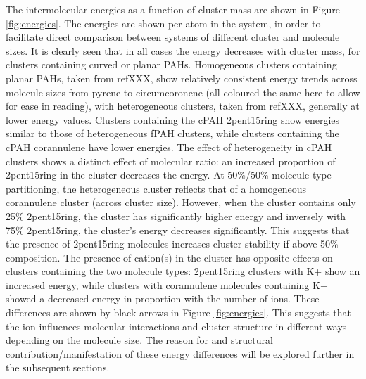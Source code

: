 The intermolecular energies as a function of cluster mass are shown in Figure \ref{fig:energies}.  The energies are shown per atom in the system, in order to facilitate direct comparison between systems of different cluster and molecule sizes.
It is clearly seen that in all cases the energy decreases with cluster mass, for clusters containing curved or planar PAHs.  Homogeneous clusters containing planar PAHs, taken from refXXX, show relatively consistent energy trends across molecule sizes from pyrene to circumcoronene (all coloured the same here to allow for ease in reading), with heterogeneous clusters, taken from refXXX, generally at lower energy values.  Clusters containing the cPAH 2pent15ring show energies similar to those of heterogeneous fPAH clusters, while clusters containing the cPAH corannulene have lower energies.
The effect of heterogeneity in cPAH clusters shows a distinct effect of molecular ratio: an increased proportion of 2pent15ring in the cluster decreases the energy. At 50\%/50\% molecule type partitioning, the heterogeneous cluster reflects that of a homogeneous corannulene cluster (across cluster size). However, when the cluster contains only 25\% 2pent15ring, the cluster has significantly higher energy and inversely with 75\% 2pent15ring, the cluster's energy decreases significantly.  This suggests that the presence of 2pent15ring molecules increases cluster stability if above 50\% composition.
The presence of cation(s) in the cluster has opposite effects on clusters containing the two molecule types: 2pent15ring clusters with K+ show an increased energy, while clusters with corannulene molecules containing K+ showed a decreased energy in proportion with the number of ions.  These differences are shown by black arrows in Figure \ref{fig:energies}. This suggests that the ion influences molecular interactions and cluster structure in different ways depending on the molecule size.
The reason for and structural contribution/manifestation of these energy differences will be explored further in the subsequent sections.

